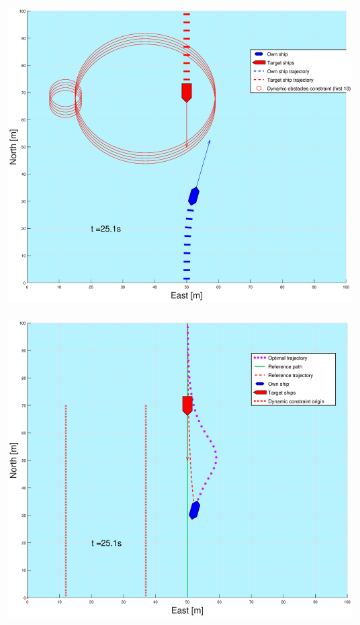 \begin{figure}[!b]
\begin{subfigure}[b]{0.499\textwidth}
    \end{subfigure}
    \hfill
    \\
    \begin{subfigure}[b]{0.49\textwidth}
        \centering
        \includegraphics[width=\textwidth]{Images/Figures/enkel_HO/_Simple_1fig1_time=25}
    \end{subfigure}
    \hfill
    \begin{subfigure}[b]{0.499\textwidth}
        \centering
        \includegraphics[width=\textwidth]{Images/Figures/enkel_HO/_Simple_1fig999_time=25}
    \end{subfigure}
    \hfill
\end{figure}%
